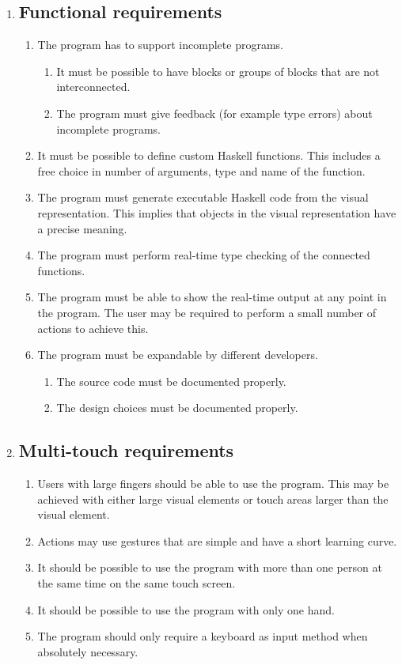 \begin{enumerate}
\item \subsection*{Functional requirements} 

\begin{enumerate}
	\item The program has to support incomplete programs.
	\begin{enumerate}
		\item It must be possible to have blocks or groups of blocks that are not interconnected.
		\item The program must give feedback (for example type errors) about incomplete programs.
	\end{enumerate}
	\item It must be possible to define custom Haskell functions. This includes a free choice in number of arguments, type and name of the function.
	\item The program must generate executable Haskell code from the visual representation. This implies that objects in the visual representation have a precise meaning.
	\item The program must perform real-time type checking of the connected functions.
	\item The program must be able to show the real-time output at any point in the program. The user may be required to perform a small number of actions to achieve this.
	\item The program must be expandable by different developers.
	\begin{enumerate}
		\item The source code must be documented properly.
		\item The design choices must be documented properly.
	\end{enumerate}
\end{enumerate}

\item \subsection*{Multi-touch requirements} 

\begin{enumerate}
	\item Users with large fingers should be able to use the program. This may be achieved with either large visual elements or touch areas larger than the visual element.
	\item Actions may use gestures that are simple and have a short learning curve.
	\item It should be possible to use the program with more than one person at the same time on the same touch screen.
	\item It should be possible to use the program with only one hand.
	\item The program should only require a keyboard as input method when absolutely necessary.
\end{enumerate}

\end{enumerate}
